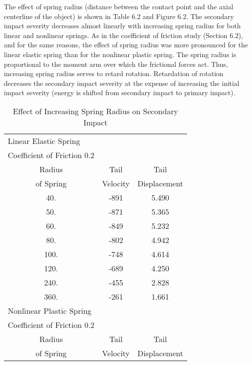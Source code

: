      The effect of spring radius (distance between the contact point
and the axial centerline of the object) 
is shown in Table 6.2 and Figure 6.2.
The secondary impact severity decreases almost linearly with
increasing spring radius for both linear and nonlinear springs.  As in
the coefficient of friction study (Section 6.2),
and for the same reasons, the
effect of spring radius was more pronounced for the linear elastic
spring than for the nonlinear plastic spring. The spring radius is
proportional to the moment arm over which the frictional forces act. 
Thus, increasing spring radius serves to retard rotation.  Retardation
of rotation decreases the secondary impact severity at the
expense of increasing the initial impact severity (energy is
shifted from secondary impact to primary impact). 

\begin{table}
\begin{center}
\caption{Effect of Increasing Spring Radius on Secondary Impact}
\begin{tabular}{||c|c|c||}
\hline
\multicolumn{1}{||l|}{Linear Elastic Spring} & &\\
\multicolumn{1}{||l|}{Coefficient of Friction 0.2} & &\\
       Radius               &Tail                  &Tail\\
      of Spring           &Velocity            &Displacement\\
         40.                &-891                  &5.490\\
         50.                &-871                  &5.365\\
         60.                &-849                  &5.232\\
         80.                &-802                  &4.942\\
        100.                &-748                  &4.614\\
        120.                &-689                  &4.250\\
        240.                &-455                  &2.828\\
        360.                &-261                  &1.661\\
\hline
\multicolumn{1}{||l|}{Nonlinear Plastic Spring} & & \\
\multicolumn{1}{||l|}{Coefficient of Friction 0.2} & & \\
       Radius               &Tail                  &Tail\\
      of Spring           &Velocity            &Displacement\\

\end{tabular}
\end{center}
\end{table}
